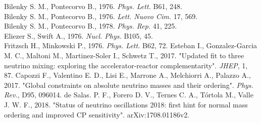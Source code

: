 \documentclass[english]{article}
\begin{document}
\begin{thebibliography}{99}
    Bilenky S. M., Pontecorvo B., 1976. \textit{Phys. Lett.} B61, 248.\\
    Bilenky S. M., Pontecorvo B., 1976. \textit{Lett. Nuovo Cim.} 17, 569.\\ 
    Bilenky S. M., Pontecorvo B., 1978. \textit{Phys. Rep.} 41, 225.\\
    Eliezer S., Swift A., 1976. \textit{Nucl. Phys.} B105, 45.\\
    Fritzsch H., Minkowski P., 1976. \textit{Phys. Lett.} B62, 72.
    Esteban I., Gonzalez-Garcia M. C., Maltoni M., Martinez-Soler I., Schwetz T., 2017. "Updated fit to three neutrino mixing: exploring the accelerator-reactor complementarity". \textit{JHEP}, 1, 87.
    Capozzi F., Valentino E. D., Lisi E., Marrone A., Melchiorri A., Palazzo A., 2017. "Global constraints on absolute neutrino masses and their ordering". \textit{Phys. Rev.}, D95, 096014.
    de Salas. P. F., Forero D. V., Ternes C. A., Tórtola M., Valle J. W. F., 2018. "Status of neutrino oscillations 2018: first hint for normal mass ordering and improved CP sensitivity". arXiv:1708.01186v2.
    
\end{thebibliography}
\end{document}
